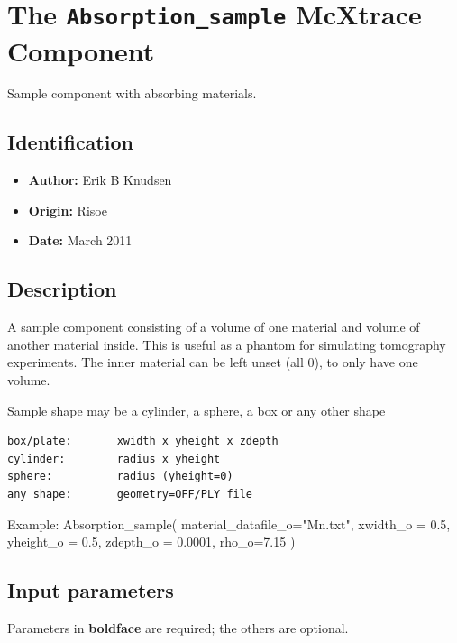 \section{The \texttt{Absorption\_sample} McXtrace Component}
Sample component with absorbing materials.

\subsection*{Identification}
\begin{itemize}
  \item \textbf{Author:} Erik B Knudsen
  \item \textbf{Origin:} Risoe
  \item \textbf{Date:} March 2011
\end{itemize}

\subsection*{Description}
A sample component consisting of a volume of one material and volume of another material inside. This is useful as a phantom for simulating tomography experiments. The inner material can be left unset (all 0), to only have one volume.

Sample shape may be a cylinder, a sphere, a box or any other shape

\begin{verbatim}
box/plate:       xwidth x yheight x zdepth
cylinder:        radius x yheight
sphere:          radius (yheight=0)
any shape:       geometry=OFF/PLY file
\end{verbatim}

Example: Absorption\_sample( material\_datafile\_o="Mn.txt", xwidth\_o = 0.5, yheight\_o = 0.5, zdepth\_o = 0.0001, rho\_o=7.15 )

\subsection*{Input parameters}
Parameters in \textbf{boldface} are required; the others are optional.

